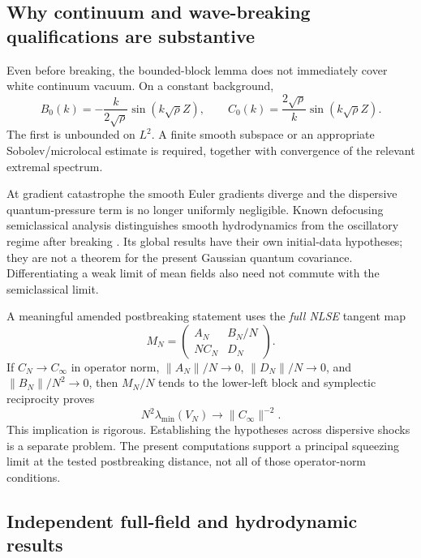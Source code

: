 \documentclass[11pt,a4paper]{article}
\begin{document}
\subsection{Why continuum and wave-breaking qualifications are substantive}

Even before breaking, the bounded-block lemma does not immediately cover white continuum vacuum. On a constant background,
\begin{equation}
B_0(k)=-\frac{k}{2\sqrt\rho}\sin(k\sqrt\rho Z),\qquad
C_0(k)=\frac{2\sqrt\rho}{k}\sin(k\sqrt\rho Z).
\end{equation}
The first is unbounded on $L^2$. A finite smooth subspace or an appropriate Sobolev/microlocal estimate is required, together with convergence of the relevant extremal spectrum.

At gradient catastrophe the smooth Euler gradients diverge and the dispersive quantum-pressure term is no longer uniformly negligible. Known defocusing semiclassical analysis distinguishes smooth hydrodynamics from the oscillatory regime after breaking \cite{jin}. Its global results have their own initial-data hypotheses; they are not a theorem for the present Gaussian quantum covariance. Differentiating a weak limit of mean fields also need not commute with the semiclassical limit.

A meaningful amended postbreaking statement uses the \emph{full NLSE} tangent map
\begin{equation}
M_N=\begin{pmatrix}A_N&B_N/N\\NC_N&D_N\end{pmatrix}.
\end{equation}
If $C_N\to C_\infty$ in operator norm, $\|A_N\|/N\to0$, $\|D_N\|/N\to0$, and $\|B_N\|/N^2\to0$, then $M_N/N$ tends to the lower-left block and symplectic reciprocity proves
\begin{equation}
N^2\lambda_{\min}(V_N)\longrightarrow\|C_\infty\|^{-2}.
\end{equation}
This implication is rigorous. Establishing the hypotheses across dispersive shocks is a separate problem. The present computations support a principal squeezing limit at the tested postbreaking distance, not all of those operator-norm conditions.

\subsection{Independent full-field and hydrodynamic results}
\end{document}
